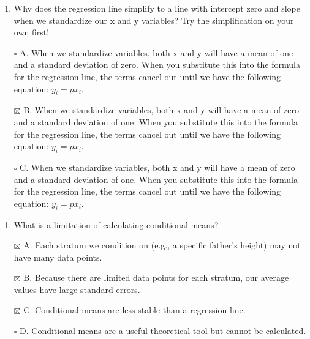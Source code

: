 \documentclass[
]{article}
\providecommand{\tightlist}{%
  \setlength{\itemsep}{0pt}\setlength{\parskip}{0pt}}
\begin{document}
\begin{enumerate}
\def\labelenumi{\arabic{enumi}.}
\setcounter{enumi}{1}
\tightlist
\item
  Why does the regression line simplify to a line with intercept zero
  and slope when we standardize our x and y variables? Try the
  simplification on your own first!
\end{enumerate}

\begin{itemize}
\tightlist
\item[$\square$]
  A. When we standardize variables, both x and y will have a mean of one
  and a standard deviation of zero. When you substitute this into the
  formula for the regression line, the terms cancel out until we have
  the following equation: \(y_i=px_i\).
\item[$\boxtimes$]
  B. When we standardize variables, both x and y will have a mean of
  zero and a standard deviation of one. When you substitute this into
  the formula for the regression line, the terms cancel out until we
  have the following equation: \(y_i = px_i\).
\item[$\square$]
  C. When we standardize variables, both x and y will have a mean of
  zero and a standard deviation of one. When you substitute this into
  the formula for the regression line, the terms cancel out until we
  have the following equation: \(y_i=px_i\).
\end{itemize}

\begin{enumerate}
\def\labelenumi{\arabic{enumi}.}
\setcounter{enumi}{2}
\tightlist
\item
  What is a limitation of calculating conditional means?
\end{enumerate}

\begin{itemize}
\tightlist
\item[$\boxtimes$]
  A. Each stratum we condition on (e.g., a specific father's height) may
  not have many data points.
\item[$\boxtimes$]
  B. Because there are limited data points for each stratum, our average
  values have large standard errors.
\item[$\boxtimes$]
  C. Conditional means are less stable than a regression line.
\item[$\square$]
  D. Conditional means are a useful theoretical tool but cannot be
  calculated.
\end{itemize}
\end{document}
